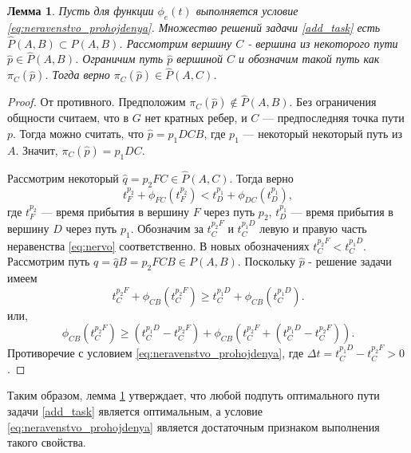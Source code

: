 \documentclass[12pt, a4paper]{article}
\newtheorem{lemma}{Лемма}[section]
\begin{document}
		\begin{lemma}
		\label{lemma:uslovie}
		Пусть для функции $\phi_e(t)$ выполняется условие \eqref{eq:neravenstvo_prohojdenya}. Множество решений задачи \eqref{add_task} есть $\widehat{P} (A, B) \subset P (A, B)$. Рассмотрим вершину $C$ - вершина из некоторого пути $\widehat{p} \in \widehat{P} (A, B)$. Ограничим  путь $\widehat{p}$ вершиной $C$ и обозначим такой путь как  $\pi_C(\widehat{p})$. Тогда верно $\pi_C(\widehat{p}) \in \widehat{P} (A, C)$.  
	\end{lemma}
	
	\begin{proof}
		От противного. Предположим $\pi_C(\widehat{p}) \notin \widehat{P} (A, B)$. Без ограничения общности считаем, что в $G$ нет кратных ребер, и $C$ --- предпоследняя точка пути $p$. Тогда можно считать, что $\widehat{p} = p_1DCB$, где $p_1$ --- некоторый некоторый путь из $A$. Значит, $\pi_C(\widehat{p}) = p_1DC$. 
		
		
		Рассмотрим некоторый $\widehat{q} = p_2FC \in \widehat{P} (A, C)$. Тогда верно
		\begin{equation}
			\label{eq:nervo}
			t_F^{p_2} + \phi_{FC}(t_F^{p_2}) < t_D^{p_1} + \phi_{DC}(t_D^{p_1}),
		\end{equation}
		где $t_F^{p_2}$ --- время прибытия в вершину $F$ через путь $p_2$, $t_D^{p_1}$ --- время прибытия в  вершину $D$ через путь $p_1$. Обозначим за $t_{C}^{p_2F}$ и $t_{C}^{p_1D}$ левую и правую часть неравенства \eqref{eq:nervo} соответственно. В новых обозначениях $t_{C}^{p_2F} < t_{C}^{p_1D}$.
		Рассмотрим путь $q = \widehat{q}B =  p_2FCB \in P (A, B)$. Поскольку $\widehat{p}$ - решение задачи имеем 
		\begin{equation*}
			\label{eq:nervo_reshenie1}
			t_{C}^{p_2F} + \phi_{CB}(t_{C}^{p_2F}) \ge t_{C}^{p_1D} + \phi_{CB}(t_{C}^{p_1D}).
		\end{equation*}
		или, 
		\begin{equation}
			\label{eq:nervo_reshenie2}
			\phi_{CB}\left(t_{C}^{p_2F}\right) \ge \left(t_{C}^{p_1D} - t_{C}^{p_2F}\right) + \phi_{CB}\left(t_{C}^{p_2F} + \left(t_{C}^{p_1D} - t_{C}^{p_2F}\right)\right).
		\end{equation}
		Противоречие с условием \eqref{eq:neravenstvo_prohojdenya}, где $\Delta t = t_{C}^{p_1D} - t_{C}^{p_2F} > 0$.
	\end{proof}
	
	Таким образом, лемма \ref{lemma:uslovie} утверждает, что любой подпуть оптимального пути задачи \eqref{add_task} является оптимальным, а условие \eqref{eq:neravenstvo_prohojdenya} является достаточным признаком выполнения такого свойства.
	
\end{document}
